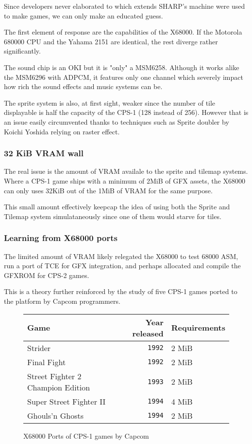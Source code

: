 Since developers never elaborated to which extends SHARP's machine were used to make games, we can only make an educated guess.

The first element of response are the capabilities of the X68000. If the Motorola 680000 CPU and the Yahama 2151 are identical, the rest diverge rather significantly.

The sound chip is an OKI but it is "only" a MSM6258. Although it works alike the MSM6296 with ADPCM, it features only one channel which severely impact how rich the sound effects and music systems can be.

The sprite system is also, at first sight, weaker since the number of tile displayable is half the capacity of the CPS-1 (128 instead of 256). However that is an issue easily circumvented thanks to techniques such as Sprite doubler by Koichi Yoshida\cite{x68000spritedoubler} relying on raster effect.

\subsubsection{32 KiB VRAM wall}

The real issue is the amount of VRAM availale to the sprite and tilemap systems. Where a CPS-1 game ships with a minimum of 2MiB of GFX assets, the X68000 can only uses 32KiB out of the 1MiB of VRAM for the same purpose. 

This small amount effectively keepcap the idea of using both the Sprite and Tilemap system simulataneously since one of them would starve for tiles. 

\subsubsection{Learning from X68000 ports}

The limited amount of VRAM likely relegated the X68000 to test 68000 ASM, run a port of TCE for GFX integration, and perhaps allocated and compile the GFXROM for CPS-2 games. 

This is a theory further reinforced by the study of five CPS-1 games ported to the platform by Capcom programmers.

\begin{figure}[H]

\begin{tabularx}{\textwidth}{lrY}
  \toprule    
  \textbf{Game } & \textbf{ Year released}  & \textbf{Requirements } \\               
  \toprule   
  Strider & \texttt{1992} &  2 MiB \\
  Final Fight & \texttt{1992} &  2 MiB \\
  Street Fighter 2 Champion Edition & \texttt{1993} &  2 MiB \\
  Super Street Fighter II & \texttt{1994} &  4 MiB \\
  Ghouls'n Ghosts & \texttt{1994} &  2 MiB \\
    \toprule   
\end{tabularx}
\caption*{X68000 Ports of CPS-1 games by Capcom}
\end{figure}

